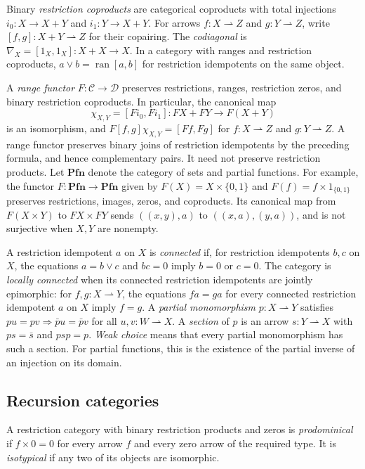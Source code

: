 \documentclass[11pt]{article}
\newcommand{\Pfn}{\mathbf{Pfn}}
\newcommand{\ran}{\operatorname{ran}}
\begin{document}
Binary \emph{restriction coproducts} are categorical coproducts with
total injections $i_0:X\to X+Y$ and $i_1:Y\to X+Y$.
For arrows $f:X\rightharpoonup Z$ and $g:Y\rightharpoonup Z$,
write $[f,g]:X+Y\rightharpoonup Z$ for their copairing.
The \emph{codiagonal} is
$\nabla_X=[1_X,1_X]:X+X\to X$.
In a category with ranges and restriction coproducts,
$a\vee b=\ran[a,b]$ for restriction idempotents on the same object.

A \emph{range functor} $F:\mathcal C\to\mathcal D$ preserves
restrictions, ranges, restriction zeros, and binary
restriction coproducts. In particular, the canonical map
\[
 \chi_{X,Y}=[F i_0,F i_1]:FX+FY\longrightarrow F(X+Y)
\]
is an isomorphism, and
$F[f,g]\chi_{X,Y}=[Ff,Fg]$ for $f:X\rightharpoonup Z$ and
$g:Y\rightharpoonup Z$. A range functor preserves binary
joins of restriction idempotents by the preceding formula, and hence
complementary pairs.
It need not preserve restriction products. Let $\Pfn$ denote the
category of sets and partial functions. For example, the functor
$F:\Pfn\to\Pfn$ given by $F(X)=X\times\{0,1\}$ and
$F(f)=f\times1_{\{0,1\}}$ preserves restrictions, images, zeros,
and coproducts. Its canonical map from $F(X\times Y)$ to
$FX\times FY$ sends $((x,y),a)$ to $((x,a),(y,a))$, and is
not surjective when $X,Y$ are nonempty.

A restriction idempotent $a$ on $X$ is \emph{connected} if, for
restriction idempotents $b,c$ on $X$, the equations $a=b\vee c$ and
$bc=0$ imply $b=0$ or $c=0$. The category is \emph{locally connected}
when its connected restriction idempotents are jointly epimorphic: for
$f,g:X\rightharpoonup Y$, the equations $fa=ga$ for every connected
restriction idempotent $a$ on $X$ imply $f=g$.
A \emph{partial monomorphism} $p:X\rightharpoonup Y$ satisfies
$pu=pv\Rightarrow\bar p u=\bar p v$ for all
$u,v:W\rightharpoonup X$.
A \emph{section} of $p$ is an arrow $s:Y\rightharpoonup X$
with $ps=\bar s$ and $psp=p$.
\emph{Weak choice} means that every partial monomorphism has such
a section. For partial functions, this is the existence of the
partial inverse of an injection on its domain.

\subsection{Recursion categories}

A restriction category with binary restriction products and zeros is
\emph{prodominical} if $f\times0=0$ for every arrow $f$ and every
zero arrow of the required type. It is \emph{isotypical} if any
two of its objects are isomorphic.
\end{document}
